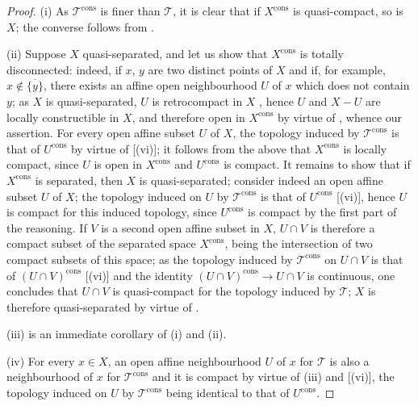 \begin{proof}
(i) As $\mathscr{T}^{\mathrm{cons}}$ is finer than $\mathscr{T}$, it is clear that if $X^{\mathrm{cons}}$ is quasi-compact, so is $X$; the converse follows from .

(ii) Suppose $X$ quasi-separated, and let us show that $X^{\mathrm{cons}}$ is totally disconnected: indeed, if $x$, $y$ are two distinct points of $X$ and if, for example, $x\notin\overline{\{y\}}$, there exists an
affine open neighbourhood $U$ of $x$ which does not contain $y$; as $X$ is quasi-separated, $U$ is retrocompact in $X$ , hence $U$ and $X-U$ are locally constructible in $X$, and therefore open in $X^{\mathrm{cons}}$ by virtue of , whence our assertion.
For every open affine subset $U$ of $X$, the topology induced by $\mathscr{T}^{\mathrm{cons}}$ is that of $U^{\mathrm{cons}}$ by virtue of [(vi)]; it follows from the above that $X^{\mathrm{cons}}$ is locally compact, since $U$ is open in $X^{\mathrm{cons}}$ and $U^{\mathrm{cons}}$ is compact.
It remains to show that if $X^{\mathrm{cons}}$ is separated, then $X$ is quasi-separated; consider indeed an open affine subset $U$ of $X$; the topology induced on $U$ by $\mathscr{T}^{\mathrm{cons}}$ is that of $U^{\mathrm{cons}}$ [(vi)], hence $U$ is compact for this induced topology, since $U^{\mathrm{cons}}$ is compact by the first part of the reasoning.
If $V$ is a second open affine subset in $X$, $U\cap V$ is therefore a compact subset of the separated space $X^{\mathrm{cons}}$, being the intersection of two compact subsets of this space; as the topology induced by $\mathscr{T}^{\mathrm{cons}}$ on $U\cap V$ is that of $(U\cap V)^{\mathrm{cons}}$ [(vi)] and the identity $(U\cap V)^{\mathrm{cons}}\to U\cap V$ is continuous, one concludes that $U\cap V$ is quasi-compact for the topology induced by $\mathscr{T}$; $X$ is therefore quasi-separated by virtue of .

(iii) is an immediate corollary of (i) and (ii).

(iv) For every $x\in X$, an open affine neighbourhood $U$ of $x$ for $\mathscr{T}$ is also a neighbourhood of $x$ for $\mathscr{T}^{\mathrm{cons}}$ and it is compact by virtue of (iii) and [(vi)], the topology induced on $U$ by $\mathscr{T}^{\mathrm{cons}}$ being identical to that of $U^{\mathrm{cons}}$.


\end{proof}

